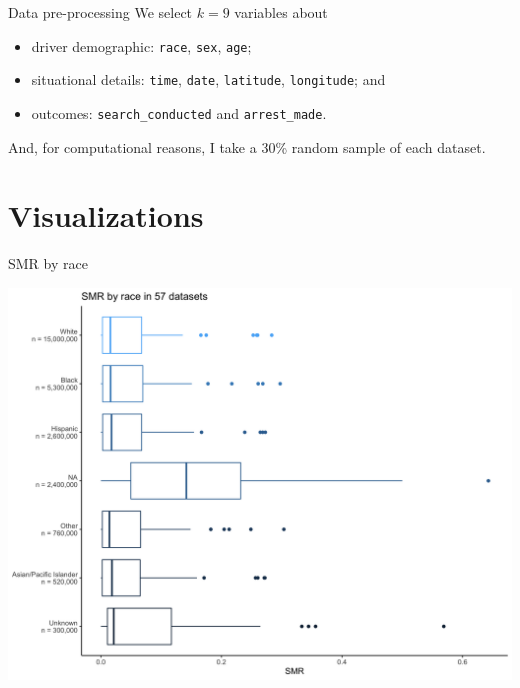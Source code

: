 \documentclass[11pt]{beamer}
\begin{document}

\begin{frame}{Data pre-processing}
	We select $k = 9$ variables about 
	\begin{itemize} 
	\item driver demographic: \texttt{race}, \texttt{sex}, \texttt{age};
	\item situational details: \texttt{time}, \texttt{date}, \texttt{latitude}, \texttt{longitude}; and
	\item outcomes: \texttt{search\_conducted} and \texttt{arrest\_made}.
	\end{itemize} 
	And, for computational reasons, I take a 30\% random sample of each dataset. 
\end{frame}


\section{Visualizations}
\frame{\sectionpage}

\begin{frame}{SMR by race}
	\begin{center}
	\includegraphics[scale=0.1]{fig/SMR_by_race.png}
	\end{center}
\end{frame}
\end{document}
